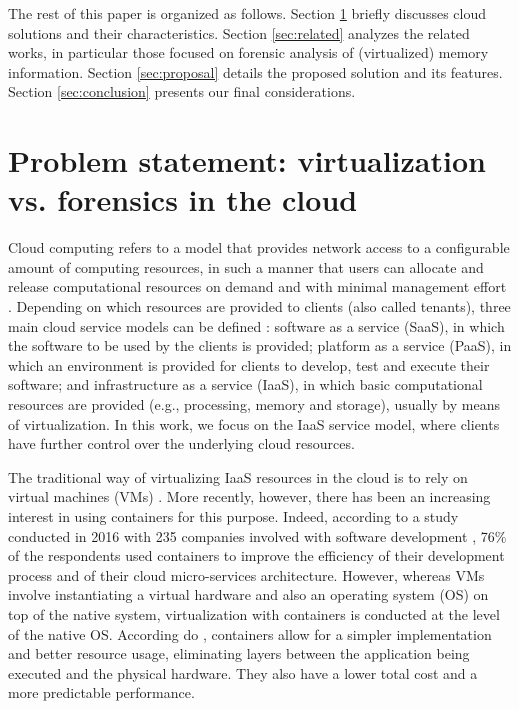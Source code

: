 \documentclass[conference]{IEEEtran}
\begin{document}
The rest of this paper is organized as follows.
%
Section \ref{sec:cloud} briefly discusses cloud solutions and their characteristics.
%
Section \ref{sec:related} analyzes the related works, in particular those focused on forensic analysis of (virtualized) memory information.
%
Section \ref{sec:proposal} details the proposed solution and its features.
%
Section \ref{sec:conclusion} presents our final considerations.



\section{Problem statement: virtualization vs. forensics in the cloud}
\label{sec:cloud}


Cloud computing refers to a model that provides network access to a configurable amount of computing resources, in such a manner that users can allocate and release computational resources on demand and with minimal management effort \cite{NIST2011}.
%
Depending on which resources are provided to clients (also called tenants), three main cloud service models can be defined \cite{NIST2011}: software as a service (SaaS), in which the software to be used by the clients is provided; platform as a service (PaaS), in which an environment is provided for clients to develop, test and execute their software; and infrastructure as a service (IaaS), in which basic computational resources are provided (e.g., processing, memory and storage), usually by means of virtualization.
%
In this work, we focus on the IaaS service model, where clients have further control over the underlying cloud resources.


The traditional way of virtualizing IaaS resources in the cloud is to rely on virtual machines (VMs) \cite{Diamanti:2018}.
%
More recently, however, there has been an increasing interest in using containers for this purpose.
%
Indeed, according to a study conducted in 2016 with 235 companies involved with software development \cite{container-survey:2016}, 76\% of the respondents used containers to improve the efficiency of their development process and of their cloud micro-services architecture.
%
However, whereas VMs involve instantiating a virtual hardware and also an operating system (OS) on top of the native system, virtualization with containers is conducted at the level of the native OS.
%
According do \cite{Diamanti:2018}, containers allow for a simpler implementation and better resource usage, eliminating layers between the application being executed and the physical hardware.
%
They also have a lower total cost and a more predictable performance.
%
\end{document}
